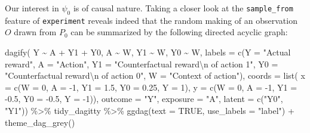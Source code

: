 \documentclass[
  11pt,
  openright,twoside]{book}
\newenvironment{Shaded}{\begin{snugshade}}{\end{snugshade}}
\newcommand{\AttributeTok}[1]{\textcolor[rgb]{0.77,0.63,0.00}{#1}}
\newcommand{\ConstantTok}[1]{\textcolor[rgb]{0.00,0.00,0.00}{#1}}
\newcommand{\DecValTok}[1]{\textcolor[rgb]{0.00,0.00,0.81}{#1}}
\newcommand{\FloatTok}[1]{\textcolor[rgb]{0.00,0.00,0.81}{#1}}
\newcommand{\FunctionTok}[1]{\textcolor[rgb]{0.00,0.00,0.00}{#1}}
\newcommand{\NormalTok}[1]{#1}
\newcommand{\SpecialCharTok}[1]{\textcolor[rgb]{0.00,0.00,0.00}{#1}}
\newcommand{\StringTok}[1]{\textcolor[rgb]{0.31,0.60,0.02}{#1}}
\theoremstyle{definition}
\theoremstyle{definition}
\theoremstyle{definition}
\theoremstyle{definition}
\theoremstyle{remark}
\begin{document}
Our interest in \(\psi_{0}\) is of causal nature. Taking a closer look at the
\texttt{sample\_from} feature of \texttt{experiment} reveals indeed that the random making of
an observation \(O\) drawn from \(P_{0}\) can be summarized by the following
directed acyclic graph:



\begin{Shaded}
\begin{Highlighting}[]
\FunctionTok{dagify}\NormalTok{(}
\NormalTok{  Y }\SpecialCharTok{\textasciitilde{}}\NormalTok{ A }\SpecialCharTok{+}\NormalTok{ Y1 }\SpecialCharTok{+}\NormalTok{ Y0, A }\SpecialCharTok{\textasciitilde{}}\NormalTok{ W, Y1 }\SpecialCharTok{\textasciitilde{}}\NormalTok{ W, Y0 }\SpecialCharTok{\textasciitilde{}}\NormalTok{ W,}
  \AttributeTok{labels =} \FunctionTok{c}\NormalTok{(}\AttributeTok{Y =} \StringTok{"Actual reward"}\NormalTok{,}
             \AttributeTok{A =} \StringTok{"Action"}\NormalTok{,}
             \AttributeTok{Y1 =} \StringTok{"Counterfactual reward}\SpecialCharTok{\textbackslash{}n}\StringTok{ of action 1"}\NormalTok{,}
             \AttributeTok{Y0 =} \StringTok{"Counterfactual reward}\SpecialCharTok{\textbackslash{}n}\StringTok{ of action 0"}\NormalTok{,}
             \AttributeTok{W =} \StringTok{"Context of action"}\NormalTok{),}
  \AttributeTok{coords =} \FunctionTok{list}\NormalTok{(}
    \AttributeTok{x =} \FunctionTok{c}\NormalTok{(}\AttributeTok{W =} \DecValTok{0}\NormalTok{, }\AttributeTok{A =} \SpecialCharTok{{-}}\DecValTok{1}\NormalTok{, }\AttributeTok{Y1 =} \FloatTok{1.5}\NormalTok{, }\AttributeTok{Y0 =} \FloatTok{0.25}\NormalTok{, }\AttributeTok{Y =} \DecValTok{1}\NormalTok{),}
    \AttributeTok{y =} \FunctionTok{c}\NormalTok{(}\AttributeTok{W =} \DecValTok{0}\NormalTok{, }\AttributeTok{A =} \SpecialCharTok{{-}}\DecValTok{1}\NormalTok{, }\AttributeTok{Y1 =} \SpecialCharTok{{-}}\FloatTok{0.5}\NormalTok{, }\AttributeTok{Y0 =} \SpecialCharTok{{-}}\FloatTok{0.5}\NormalTok{, }\AttributeTok{Y =} \SpecialCharTok{{-}}\DecValTok{1}\NormalTok{)),}
  \AttributeTok{outcome =} \StringTok{"Y"}\NormalTok{,}
  \AttributeTok{exposure =} \StringTok{"A"}\NormalTok{,}
  \AttributeTok{latent =} \FunctionTok{c}\NormalTok{(}\StringTok{"Y0"}\NormalTok{, }\StringTok{"Y1"}\NormalTok{)) }\SpecialCharTok{\%\textgreater{}\%}\NormalTok{ tidy\_dagitty }\SpecialCharTok{\%\textgreater{}\%}
  \FunctionTok{ggdag}\NormalTok{(}\AttributeTok{text =} \ConstantTok{TRUE}\NormalTok{, }\AttributeTok{use\_labels =} \StringTok{"label"}\NormalTok{) }\SpecialCharTok{+} \FunctionTok{theme\_dag\_grey}\NormalTok{()}
\end{Highlighting}
\end{Shaded}
\end{document}

